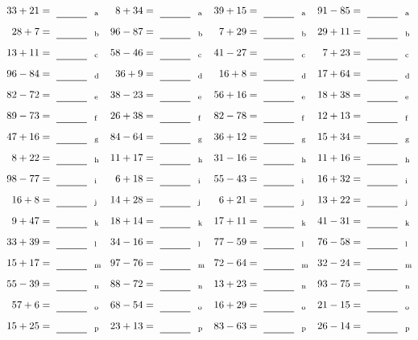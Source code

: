 \documentclass
[
  draft    = true,
  fontsize = 11pt,
  parskip  = half-
]
{scrartcl}
\begin{document}
\clearpage
\begin{align*}
    \pline{33+21}&=\rline{a}
  & \pline{8+34}&=\rline{a}
  & \pline{39+15}&=\rline{a}
  & \pline{91-85}&=\rline{a} \\[1ex]
    \pline{28+7}&=\rline{b}
  & \pline{96-87}&=\rline{b}
  & \pline{7+29}&=\rline{b}
  & \pline{29+11}&=\rline{b} \\[1ex]
    \pline{13+11}&=\rline{c}
  & \pline{58-46}&=\rline{c}
  & \pline{41-27}&=\rline{c}
  & \pline{7+23}&=\rline{c} \\[1ex]
    \pline{96-84}&=\rline{d}
  & \pline{36+9}&=\rline{d}
  & \pline{16+8}&=\rline{d}
  & \pline{17+64}&=\rline{d} \\[1ex]
    \pline{82-72}&=\rline{e}
  & \pline{38-23}&=\rline{e}
  & \pline{56+16}&=\rline{e}
  & \pline{18+38}&=\rline{e} \\[1ex]
    \pline{89-73}&=\rline{f}
  & \pline{26+38}&=\rline{f}
  & \pline{82-78}&=\rline{f}
  & \pline{12+13}&=\rline{f} \\[1ex]
    \pline{47+16}&=\rline{g}
  & \pline{84-64}&=\rline{g}
  & \pline{36+12}&=\rline{g}
  & \pline{15+34}&=\rline{g} \\[1ex]
    \pline{8+22}&=\rline{h}
  & \pline{11+17}&=\rline{h}
  & \pline{31-16}&=\rline{h}
  & \pline{11+16}&=\rline{h} \\[1ex]
    \pline{98-77}&=\rline{i}
  & \pline{6+18}&=\rline{i}
  & \pline{55-43}&=\rline{i}
  & \pline{16+32}&=\rline{i} \\[1ex]
    \pline{16+8}&=\rline{j}
  & \pline{14+28}&=\rline{j}
  & \pline{6+21}&=\rline{j}
  & \pline{13+22}&=\rline{j} \\[1ex]
    \pline{9+47}&=\rline{k}
  & \pline{18+14}&=\rline{k}
  & \pline{17+11}&=\rline{k}
  & \pline{41-31}&=\rline{k} \\[1ex]
    \pline{33+39}&=\rline{l}
  & \pline{34-16}&=\rline{l}
  & \pline{77-59}&=\rline{l}
  & \pline{76-58}&=\rline{l} \\[1ex]
    \pline{15+17}&=\rline{m}
  & \pline{97-76}&=\rline{m}
  & \pline{72-64}&=\rline{m}
  & \pline{32-24}&=\rline{m} \\[1ex]
    \pline{55-39}&=\rline{n}
  & \pline{88-72}&=\rline{n}
  & \pline{13+23}&=\rline{n}
  & \pline{93-75}&=\rline{n} \\[1ex]
    \pline{57+6}&=\rline{o}
  & \pline{68-54}&=\rline{o}
  & \pline{16+29}&=\rline{o}
  & \pline{21-15}&=\rline{o} \\[1ex]
    \pline{15+25}&=\rline{p}
  & \pline{23+13}&=\rline{p}
  & \pline{83-63}&=\rline{p}
  & \pline{26-14}&=\rline{p}
\end{align*}
\end{document}
